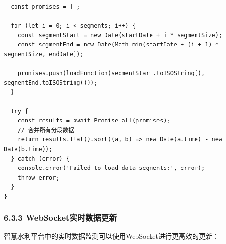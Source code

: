 \begin{lstlisting}
  const promises = [];
  
  for (let i = 0; i < segments; i++) {
    const segmentStart = new Date(startDate + i * segmentSize);
    const segmentEnd = new Date(Math.min(startDate + (i + 1) * segmentSize, endDate));
    
    promises.push(loadFunction(segmentStart.toISOString(), segmentEnd.toISOString()));
  }
  
  try {
    const results = await Promise.all(promises);
    // 合并所有分段数据
    return results.flat().sort((a, b) => new Date(a.time) - new Date(b.time));
  } catch (error) {
    console.error('Failed to load data segments:', error);
    throw error;
  }
}
\end{lstlisting}

\subsubsection{6.3.3
WebSocket实时数据更新}\label{websocketux5b9eux65f6ux6570ux636eux66f4ux65b0}

智慧水利平台中的实时数据监测可以使用WebSocket进行更高效的更新：

